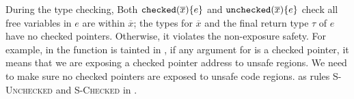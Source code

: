 {%






%
During the type checking,
Both $\mathtt{checked}({\overline{x}}){\{e\}}$ and $\mathtt{unchecked}({\overline{x}})\{e\}$
check all free variables in $e$ are within $\overline{x}$;
the types for $\overline{x}$ and the final return type $\tau$ of $e$ have no checked pointers.
Otherwise, it violates the non-exposure safety.
For example,  in the  function is tainted in ,
if any argument for  is a checked pointer, 
it means that we are exposing a checked pointer address to unsafe regions.
% 
% 
% 
We need to make sure no checked pointers are  exposed to unsafe code regions.
as rules \textsc{S-Unchecked} and \textsc{S-Checked} in .
% 
% 

}
